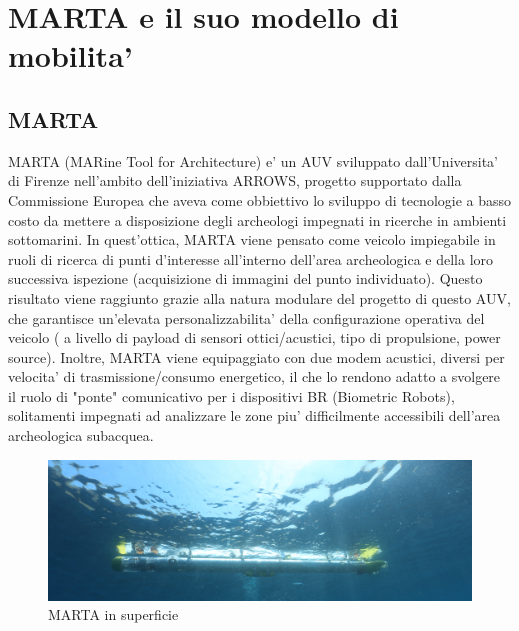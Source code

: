 \documentclass[Lau,binding=0.6cm]{sapthesis}
\begin{document}
\chapter{MARTA e il suo modello di mobilita'}

\section{MARTA}

MARTA (MARine Tool for Architecture) e' un AUV sviluppato dall'Universita' di Firenze nell'ambito dell'iniziativa ARROWS, progetto supportato dalla Commissione Europea che aveva come obbiettivo lo sviluppo di tecnologie a basso costo da mettere a disposizione degli archeologi impegnati in ricerche in ambienti sottomarini. In quest'ottica, MARTA viene pensato come veicolo impiegabile in ruoli di ricerca di punti d'interesse all'interno dell'area archeologica e della loro successiva ispezione (acquisizione di immagini del punto individuato). \newline
Questo risultato viene raggiunto grazie alla natura modulare del progetto di questo AUV, che garantisce un'elevata personalizzabilita' della configurazione operativa del veicolo ( a livello di payload di sensori ottici/acustici, tipo di propulsione, power source). \newline
Inoltre, MARTA viene equipaggiato con due modem acustici, diversi per velocita' di trasmissione/consumo energetico, il che lo rendono adatto a svolgere il ruolo di "ponte" comunicativo per i dispositivi BR (Biometric Robots), solitamenti impegnati ad analizzare le zone piu' difficilmente accessibili dell'area archeologica subacquea.

\begin{figure}[H]
	\includegraphics[width=\linewidth]{MARTA.png}
	\caption{MARTA in superficie}
	\label{fig:MARTA}
	\centering
\end{figure}
\end{document}
